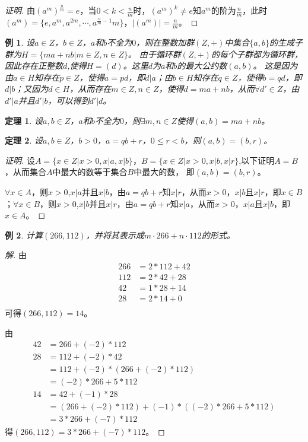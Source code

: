\documentclass{article}
\newtheorem{Thm}{定理}
\newtheorem*{Example}{例}
\begin{document}
\begin{CJK*}{UTF8}{gbsn}
\begin{proof}[证明]
    由$(a^m)^{\frac{n}{m}}=e$，当$0<k<\frac{n}{m}$时，$(a^m)^k\neq e$知$a^m$的阶为$\frac{n}{m}$，此时$(a^m)=\{e,a^m,a^{2m},\cdots,a^{\frac{n}{m}-1}m\}$，$|(a^m)|=\frac{n}{m}$。
  \end{proof}
  \begin{Example}
    设$a\in Z$，$b\in Z$，$a$和$b$不全为$0$，则在整数加群$(Z,+)$中集合$\{a,b\}$的生成子群为$H=\{ma+nb|m\in Z,n\in Z\}$。
    由于循环群$(Z,+)$的每个子群都为循环群，因此存在正整数$d$,使得$H=(d)$。这里$d$为$a$和$b$的最大公约数$(a,b)$。
    这是因为由$a\in H$知存在$p\in Z$，使得$a=pd$，即$d|a$；由$b\in H$知存在$q\in Z$，使得$b=qd$，即$d|b$；又因为$d\in H$，从而存在$m\in Z,n\in Z$，使得$d=ma+nb$，从而$\forall d'\in Z$，由$d'|a$并且$d'|b$，可以得到$d'|d$。
  \end{Example}
  \begin{Thm}
    设$a,b\in Z$，$a$和$b$不全为$0$，则$\exists m,n\in Z$使得$(a,b)=ma+nb$。
  \end{Thm}
  \begin{Thm}
    设$a,b\in Z$，$b>0$，$a=qb+r$，$0\leq r < b$，则$(a,b)=(b,r)$。
  \end{Thm}
  \begin{proof}[证明]
    设$A=\{x\in Z|x>0,x|a,x|b\}$，$B=\{x\in Z|x>0,x|b,x|r\}$,以下证明$A=B$，从而集合$A$中最大的数等于集合$B$中最大的数，
    即$(a,b)=(b,r)$。
  
    $\forall x\in A$，则$x>0$,$x|a$并且$x|b$，由$a=qb+r$知$x|r$，从而$x>0$，$x|b$且$x|r$，即$x\in B$；$\forall x\in B$，则$x>0$,$x|b$并且$x|r$，由$a=qb+r$知$x|a$，从而$x>0$，$x|a$且$x|b$，即$x\in A$。
  \end{proof}
  \begin{Example}
    计算$(266,112)$，并将其表示成$m\cdot 266 + n\cdot 112$的形式。
  \end{Example}
  \begin{proof}[解]
    由
    \begin{align*}
      266&=2*112+42\\
      112&=2*42+28\\
      42&=1*28+14\\
      28&=2*14+0\\
    \end{align*}
  可得$(266,112)=14$。
  
  由
  \begin{align*}
    42&=266+(-2)*112\\
    28&=112+(-2)*42\\
    &=112+(-2)*(266+(-2)*112)\\
    &=(-2)*266+5*112\\
    14&=42+(-1)*28\\
    &=(266+(-2)*112)+(-1)*((-2)*266+5*112)\\
    &=3*266+(-7)*112
  \end{align*}
  得$(266,112)=3*266+(-7)*112$。
  \end{proof}


\end{CJK*}
\end{document}
